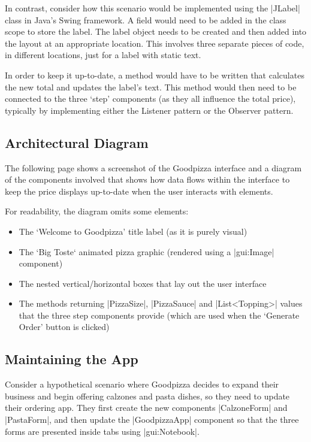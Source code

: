 \documentclass[11pt]{report}
\begin{document}
In contrast, consider how this scenario would be implemented using the |JLabel| class in Java's Swing framework. A field would need to be added in the class scope to store the label. The label object needs to be created and then added into the layout at an appropriate location. This involves three separate pieces of code, in different locations, just for a label with static text.

In order to keep it up-to-date, a method would have to be written that calculates the new total and updates the label's text. This method would then need to be connected to the three `step' components (as they all influence the total price), typically by implementing either the Listener pattern or the Observer pattern.

\subsection{Architectural Diagram}

The following page shows a screenshot of the Goodpizza interface and a diagram of the components involved that shows how data flows within the interface to keep the price displays up-to-date when the user interacts with elements.

\begingroup
\parindent=0cm
For readability, the diagram omits some elements:
\endgroup

\begin{itemize}[nosep,topsep=0pt]
    \item The `Welcome to Goodpizza' title label (as it is purely visual)
    
    \item The `Big Toste` animated pizza graphic (rendered using a |gui:Image| component)
    
    \item The nested vertical/horizontal boxes that lay out the user interface
    
    \item The methods returning |PizzaSize|, |PizzaSauce| and |List<Topping>| values that the three step components provide (which are used when the `Generate Order' button is clicked)
\end{itemize}

\subsection{Maintaining the App}

Consider a hypothetical scenario where Goodpizza decides to expand their business and begin offering calzones and pasta dishes, so they need to update their ordering app. They first create the new components |CalzoneForm| and |PastaForm|, and then update the |GoodpizzaApp| component so that the three forms are presented inside tabs using |gui:Notebook|.
\end{document}

